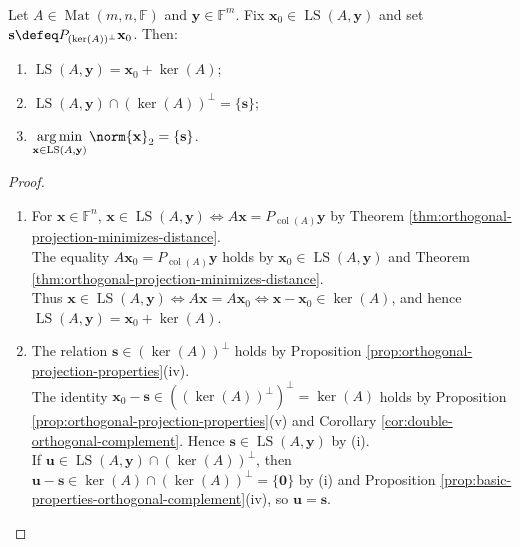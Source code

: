 \begin{proposition} \label{prop:least-squares-affine-set-and-minimum-norm} \\
Let $A\in\operatorname{Mat}(m,n,\mathbb{F})$ and $\mathbf{y}\in\mathbb{F}^m$. Fix $\mathbf{x}_0\in\operatorname{LS}(A,\mathbf{y})$ and set $\mathbf{s}\defeq P_{(\ker(A))^{\perp}}\mathbf{x}_0$. Then:
\begin{enumerate}[label=(\roman*)]
\setlength{\itemsep}{0pt}
\item $\operatorname{LS}(A,\mathbf{y})=\mathbf{x}_0+\ker(A)$;
\item $\operatorname{LS}(A,\mathbf{y})\cap(\ker(A))^{\perp}=\{\mathbf{s}\}$;
\item $\operatorname*{arg\,min}\limits_{\mathbf{x}\in\operatorname{LS}(A,\mathbf{y})}\norm{\mathbf{x}}_2=\{\mathbf{s}\}$.
\end{enumerate}
\begin{proof}
\begin{enumerate}[label=(\roman*)]
\setlength{\itemsep}{0pt}
\item For $\mathbf{x}\in\mathbb{F}^n$, $\mathbf{x}\in\operatorname{LS}(A,\mathbf{y})\Longleftrightarrow A\mathbf{x}=P_{\operatorname{col}(A)}\mathbf{y}$ by Theorem \ref{thm:orthogonal-projection-minimizes-distance}.\\
The equality $A\mathbf{x}_0=P_{\operatorname{col}(A)}\mathbf{y}$ holds by $\mathbf{x}_0\in\operatorname{LS}(A,\mathbf{y})$ and Theorem \ref{thm:orthogonal-projection-minimizes-distance}.\\
Thus $\mathbf{x}\in\operatorname{LS}(A,\mathbf{y})\Longleftrightarrow A\mathbf{x}=A\mathbf{x}_0\Longleftrightarrow\mathbf{x}-\mathbf{x}_0\in\ker(A)$, and hence $\operatorname{LS}(A,\mathbf{y})=\mathbf{x}_0+\ker(A)$.
\item The relation $\mathbf{s}\in(\ker(A))^{\perp}$ holds by Proposition \ref{prop:orthogonal-projection-properties}(iv).\\
The identity $\mathbf{x}_0-\mathbf{s}\in((\ker(A))^{\perp})^{\perp}=\ker(A)$ holds by Proposition \ref{prop:orthogonal-projection-properties}(v) and Corollary \ref{cor:double-orthogonal-complement}. Hence $\mathbf{s}\in\operatorname{LS}(A,\mathbf{y})$ by (i).\\
If $\mathbf{u}\in\operatorname{LS}(A,\mathbf{y})\cap(\ker(A))^{\perp}$, then $\mathbf{u}-\mathbf{s}\in\ker(A)\cap(\ker(A))^{\perp}=\{\mathbf{0}\}$ by (i) and Proposition \ref{prop:basic-properties-orthogonal-complement}(iv), so $\mathbf{u}=\mathbf{s}$.

\end{enumerate}
\end{proof}
\end{proposition}
